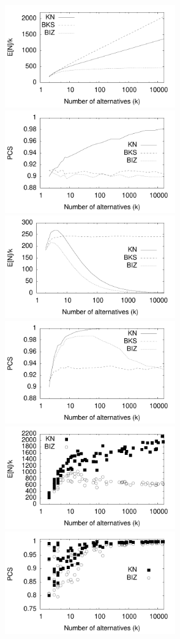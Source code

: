 \documentclass[12pt]{article}
\begin{document}

  \begin{figure}[tb]
    \center
    \includegraphics[width=2.9in]{pdf/FINAL-SC-Nk} 
    \includegraphics[width=2.9in]{pdf/FINAL-SC-PCS}
    \includegraphics[width=2.9in]{pdf/FINAL-MDM-Nk} 
    \includegraphics[width=2.9in]{pdf/FINAL-MDM-PCS}
    \includegraphics[width=2.9in]{pdf/FINAL-RPI-Nk} 
    \includegraphics[width=2.9in]{pdf/FINAL-RPI-PCS}


\end{figure}
\end{document}
